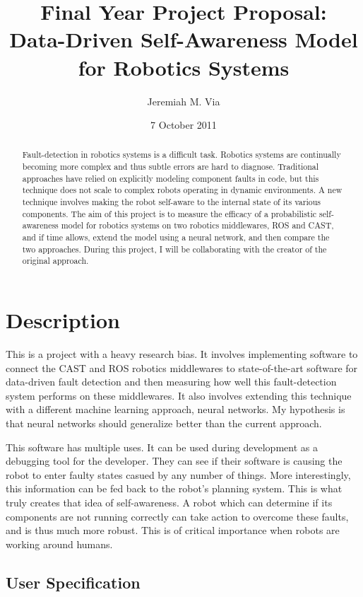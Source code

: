 \documentclass[10pt, a4paper]{article}
\title{Final Year Project Proposal:\\
  Data-Driven Self-Awareness Model for Robotics Systems}
\date{7 October 2011}
\author{Jeremiah M. Via}
\begin{document}
\maketitle

\begin{abstract}
  Fault-detection in robotics systems is a difficult task. Robotics
  systems are continually becoming more complex and thus subtle errors
  are hard to diagnose. Traditional approaches have relied on
  explicitly modeling component faults in code, but this technique
  does not scale to complex robots operating in dynamic
  environments. A new technique involves making the robot self-aware
  to the internal state of its various components. The aim of this
  project is to measure the efficacy of a probabilistic self-awareness
  model for robotics systems on two robotics middlewares, ROS and
  CAST, and if time allows, extend the model using a neural network,
  and then compare the two approaches. During this project, I will be
  collaborating with the creator of the original approach.
\end{abstract}


\section*{Description}

This is a project with a heavy research bias. It involves implementing
software to connect the CAST and ROS robotics middlewares to
state-of-the-art software for data-driven fault detection and then
measuring how well this fault-detection system performs on these
middlewares. It also involves extending this technique with a
different machine learning approach, neural networks. My hypothesis is
that neural networks should generalize better than the current
approach.

This software has multiple uses. It can be used during development as
a debugging tool for the developer. They can see if their software is
causing the robot to enter faulty states casued by any number of
things. More interestingly, this information can be fed back to the
robot's planning system. This is what truly creates that idea of
self-awareness. A robot which can determine if its components are not
running correctly can take action to overcome these faults, and is
thus much more robust. This is of critical importance when robots are
working around humans.

\subsection*{User Specification}
\end{document}
